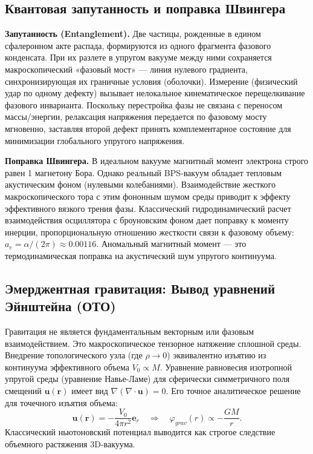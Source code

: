 \documentclass[11pt,a4paper]{article}
\begin{document}
\subsection{Квантовая запутанность и поправка Швингера}
\textbf{Запутанность (Entanglement).} Две частицы, рожденные в едином сфалеронном акте распада, формируются из одного фрагмента фазового конденсата. При их разлете в упругом вакууме между ними сохраняется макроскопический «фазовый мост» — линия нулевого градиента, синхронизирующая их граничные условия (оболочки). Измерение (физический удар по одному дефекту) вызывает нелокальное кинематическое перещелкивание фазового инварианта. Поскольку перестройка фазы не связана с переносом массы/энергии, релаксация напряжения передается по фазовому мосту мгновенно, заставляя второй дефект принять комплементарное состояние для минимизации глобального упругого напряжения.

\textbf{Поправка Швингера.} В идеальном вакууме магнитный момент электрона строго равен 1 магнетону Бора. Однако реальный BPS-вакуум обладает тепловым акустическим фоном (нулевыми колебаниями). Взаимодействие жесткого макроскопического тора с этим фононным шумом среды приводит к эффекту эффективного вязкого трения фазы. Классический гидродинамический расчет взаимодействия осциллятора с броуновским фоном дает поправку к моменту инерции, пропорциональную отношению жесткости связи к фазовому объему: $a_e = \alpha / (2\pi) \approx 0.00116$. Аномальный магнитный момент — это термодинамическая поправка на акустический шум упругого континуума.

\subsection{Эмерджентная гравитация: Вывод уравнений Эйнштейна (ОТО)}
Гравитация не является фундаментальным векторным или фазовым взаимодействием. Это макроскопическое тензорное натяжение сплошной среды. Внедрение топологического узла (где $\rho \to 0$) эквивалентно изъятию из континуума эффективного объема $V_0 \propto M$. 
Уравнение равновесия изотропной упругой среды (уравнение Навье-Ламе) для сферически симметричного поля смещений $\mathbf{u}(\mathbf{r})$ имеет вид $\nabla(\nabla \cdot \mathbf{u}) = 0$. Его точное аналитическое решение для точечного изъятия объема:
\begin{equation}
\mathbf{u}(\mathbf{r}) = -\frac{V_0}{4\pi r^2}\mathbf{e}_r \quad \Longrightarrow \quad \varphi_{grav}(r) \propto -\frac{GM}{r}.
\end{equation}
Классический ньютоновский потенциал выводится как строгое следствие объемного растяжения 3D-вакуума.
\end{document}
